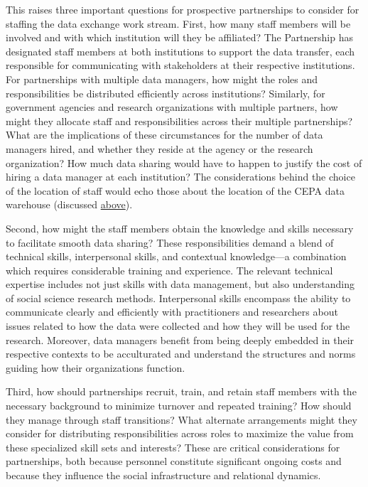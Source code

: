 \documentclass[
]{book}
\begin{document}
This raises three important questions for prospective partnerships to consider for staffing the data exchange work stream. First, how many staff members will be involved and with which institution will they be affiliated? The Partnership has designated staff members at both institutions to support the data transfer, each responsible for communicating with stakeholders at their respective institutions. For partnerships with multiple data managers, how might the roles and responsibilities be distributed efficiently across institutions? Similarly, for government agencies and research organizations with multiple partners, how might they allocate staff and responsibilities across their multiple partnerships? What are the implications of these circumstances for the number of data managers hired, and whether they reside at the agency or the research organization? How much data sharing would have to happen to justify the cost of hiring a data manager at each institution? The considerations behind the choice of the location of staff would echo those about the location of the CEPA data warehouse (discussed \protect\hyperlink{data-warehouse}{above}).

Second, how might the staff members obtain the knowledge and skills necessary to facilitate smooth data sharing? These responsibilities demand a blend of technical skills, interpersonal skills, and contextual knowledge---a combination which requires considerable training and experience. The relevant technical expertise includes not just skills with data management, but also understanding of social science research methods. Interpersonal skills encompass the ability to communicate clearly and efficiently with practitioners and researchers about issues related to how the data were collected and how they will be used for the research. Moreover, data managers benefit from being deeply embedded in their respective contexts to be acculturated and understand the structures and norms guiding how their organizations function.

Third, how should partnerships recruit, train, and retain staff members with the necessary background to minimize turnover and repeated training? How should they manage through staff transitions? What alternate arrangements might they consider for distributing responsibilities across roles to maximize the value from these specialized skill sets and interests? These are critical considerations for partnerships, both because personnel constitute significant ongoing costs and because they influence the social infrastructure and relational dynamics.
\end{document}
